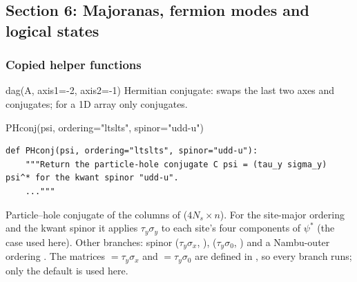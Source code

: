 \subsection{Section 6: Majoranas, fermion modes and logical states}

\subsubsection*{Copied helper functions}

\begin{function}{dag(A, axis1=-2, axis2=-1)}
Hermitian conjugate: swaps the last two axes and conjugates; for a 1D array only conjugates.
\end{function}

\begin{function}{PHconj(psi, ordering="ltslts", spinor="udd-u")}
\begin{Verbatim}
def PHconj(psi, ordering="ltslts", spinor="udd-u"):
    """Return the particle-hole conjugate C psi = (tau_y sigma_y) psi^* for the kwant spinor "udd-u".
    ..."""
\end{Verbatim}
Particle--hole conjugate of the columns of  ($4N_s\times n$). For the site-major ordering  and the kwant spinor
 it applies $\tau_y\sigma_y$ to each site's four components of $\psi^*$ (the case used here). Other branches: spinor 
($\tau_y\sigma_x$, ),  ($\tau_y\sigma_0$, ) and a Nambu-outer ordering . The matrices
 $=\tau_y\sigma_x$ and  $=\tau_y\sigma_0$ are defined in , so every branch runs; only the default is used here.
\end{function}

